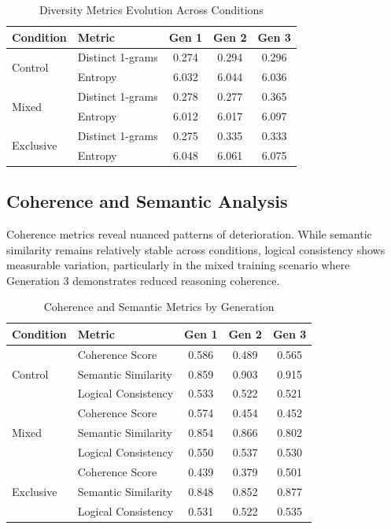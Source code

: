 \documentclass{article}
\begin{document}
\begin{table}[H]
\centering
\caption{Diversity Metrics Evolution Across Conditions}
\label{tab:diversity_evolution}
\begin{tabular}{llccc}
\toprule
\textbf{Condition} & \textbf{Metric} & \textbf{Gen 1} & \textbf{Gen 2} & \textbf{Gen 3} \\
\midrule
\multirow{2}{*}{Control} & Distinct 1-grams & 0.274 & 0.294 & 0.296 \\
 & Entropy & 6.032 & 6.044 & 6.036 \\
\midrule
\multirow{2}{*}{Mixed} & Distinct 1-grams & 0.278 & 0.277 & 0.365 \\
 & Entropy & 6.012 & 6.017 & 6.097 \\
\midrule
\multirow{2}{*}{Exclusive} & Distinct 1-grams & 0.275 & 0.335 & 0.333 \\
 & Entropy & 6.048 & 6.061 & 6.075 \\
\bottomrule
\end{tabular}
\end{table}

\subsection{Coherence and Semantic Analysis}

Coherence metrics reveal nuanced patterns of deterioration. While semantic similarity remains relatively stable across conditions, logical consistency shows measurable variation, particularly in the mixed training scenario where Generation 3 demonstrates reduced reasoning coherence.

\begin{table}[H]
\centering
\caption{Coherence and Semantic Metrics by Generation}
\label{tab:coherence_metrics}
\begin{tabular}{llccc}
\toprule
\textbf{Condition} & \textbf{Metric} & \textbf{Gen 1} & \textbf{Gen 2} & \textbf{Gen 3} \\
\midrule
\multirow{3}{*}{Control} & Coherence Score & 0.586 & 0.489 & 0.565 \\
 & Semantic Similarity & 0.859 & 0.903 & 0.915 \\
 & Logical Consistency & 0.533 & 0.522 & 0.521 \\
\midrule
\multirow{3}{*}{Mixed} & Coherence Score & 0.574 & 0.454 & 0.452 \\
 & Semantic Similarity & 0.854 & 0.866 & 0.802 \\
 & Logical Consistency & 0.550 & 0.537 & 0.530 \\
\midrule
\multirow{3}{*}{Exclusive} & Coherence Score & 0.439 & 0.379 & 0.501 \\
 & Semantic Similarity & 0.848 & 0.852 & 0.877 \\
 & Logical Consistency & 0.531 & 0.522 & 0.535 \\
\bottomrule
\end{tabular}
\end{table}
\end{document}
